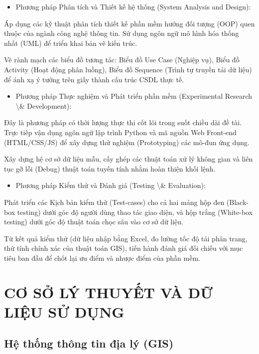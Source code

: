 \documentclass[13pt,a4paper]{report}
\begin{document}
\begin{itemize}
    \item Phương pháp Phân tích và Thiết kế hệ thống (System Analysis and Design):
\end{itemize}

Áp dụng các kỹ thuật phân tích thiết kế phần mềm hướng đối tượng (OOP) quen thuộc của ngành công nghệ thông tin. Sử dụng ngôn ngữ mô hình hóa thống nhất (UML) để triển khai bản vẽ kiến trúc.

Vẽ rành mạch các biểu đồ tương tác: Biểu đồ Use Case (Nghiệp vụ), Biểu đồ Activity (Hoạt động phân luồng), Biểu đồ Sequence (Trình tự truyền tải dữ liệu) để ánh xạ ý tưởng trên giấy thành cấu trúc CSDL thực tế.

\begin{itemize}
    \item Phương pháp Thực nghiệm và Phát triển phần mềm (Experimental Research \textbackslash{}& Development):
\end{itemize}

Đây là phương pháp có thời lượng thực thi cốt lõi trong suốt chiều dài đề tài. Trực tiếp vận dụng ngôn ngữ lập trình Python và mã nguồn Web Front-end (HTML/CSS/JS) để xây dựng thử nghiệm (Prototyping) các mô-đun ứng dụng.

Xây dựng hệ cơ sở dữ liệu mẫu, cấy ghép các thuật toán xử lý không gian và liên tục gỡ lỗi (Debug) thuật toán tuyến tính nhằm hoàn thiện khối lệnh.

\begin{itemize}
    \item Phương pháp Kiểm thử và Đánh giá (Testing \textbackslash{}& Evaluation):
\end{itemize}

Phát triển các Kịch bản kiểm thử (Test-cases) cho cả hai mảng hộp đen (Black-box testing) dưới góc độ người dùng thao tác giao diện, và hộp trắng (White-box testing) dưới góc độ thuật toán chọc sâu vào cơ sở dữ liệu.

Từ kết quả kiểm thử (dữ liệu nhập bằng Excel, đo lường tốc độ tải phân trang, thử tính chính xác của thuật toán GIS), tiến hành đánh giá đối chiếu với mục tiêu ban đầu để chốt lại ưu điểm và nhược điểm của phần mềm.

\chapter{CƠ SỞ LÝ THUYẾT VÀ DỮ LIỆU SỬ DỤNG}

\section{Hệ thống thông tin địa lý (GIS)}
\end{document}
